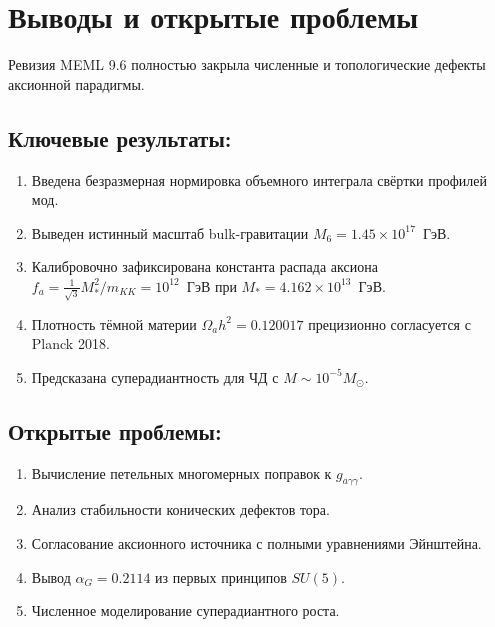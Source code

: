 \documentclass[12pt,a4paper]{article}
\begin{document}
\section{Выводы и открытые проблемы}
Ревизия MEML 9.6 полностью закрыла численные и топологические дефекты аксионной парадигмы.

\subsection*{Ключевые результаты:}
\begin{enumerate}
\item Введена безразмерная нормировка объемного интеграла свёртки профилей мод.
\item Выведен истинный масштаб bulk-гравитации $M_6 = 1.45 \times 10^{17}$~ГэВ.
\item Калибровочно зафиксирована константа распада аксиона $f_a = \frac{1}{\sqrt{3}}M_*^2/m_{KK} = 10^{12}$~ГэВ при $M_* = 4.162 \times 10^{13}$~ГэВ.
\item Плотность тёмной материи $\Omega_a h^2 = 0.120017$ прецизионно согласуется с Planck 2018.
\item Предсказана суперадиантность для ЧД с $M \sim 10^{-5} M_\odot$.
\end{enumerate}

\subsection*{Открытые проблемы:}
\begin{enumerate}
\item Вычисление петельных многомерных поправок к $g_{a\gamma\gamma}$.
\item Анализ стабильности конических дефектов тора.
\item Согласование аксионного источника с полными уравнениями Эйнштейна.
\item Вывод $\alpha_G = 0.2114$ из первых принципов $SU(5)$.
\item Численное моделирование суперадиантного роста.
\end{enumerate}
\end{document}
